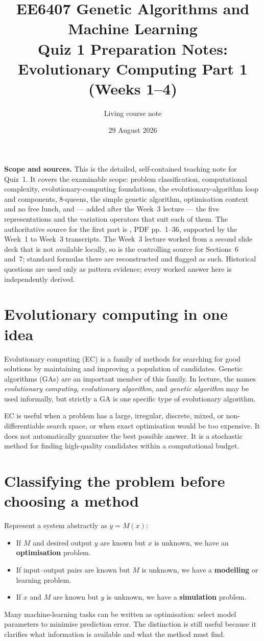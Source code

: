 \documentclass[11pt,a4paper]{article}
\title{EE6407 Genetic Algorithms and Machine Learning\\
\large Quiz 1 Preparation Notes: Evolutionary Computing Part 1 (Weeks 1--4)}
\author{Living course note}
\date{29 August 2026}
\begin{document}
\maketitle
\noindent\textbf{Scope and sources.} This is the detailed, self-contained
teaching note for Quiz~1. It covers the examinable scope: problem
classification, computational complexity, evolutionary-computing foundations,
the evolutionary-algorithm loop and components, 8-queens, the simple genetic
algorithm, optimisation context and no free lunch, and --- added after the
Week~3 lecture --- the five representations and the variation operators that
suit each of them. The authoritative source for the first part is
, PDF
pp.~1--36, supported by the Week~1 to Week~3 transcripts. The Week~3 lecture
worked from a second slide deck that is not available locally, so
 is the controlling source for
Sections~6 and~7; standard formulas there are reconstructed and flagged as
such. Historical questions are used only as pattern evidence; every worked
answer here is independently derived.
\tableofcontents

\section{\enspace Evolutionary computing in one idea}
Evolutionary computing (EC) is a family of methods for searching for good solutions by maintaining and improving a population of candidates. Genetic algorithms (GAs) are an important member of this family. In lecture, the names \emph{evolutionary computing}, \emph{evolutionary algorithm}, and \emph{genetic algorithm} may be used informally, but strictly a GA is one specific type of evolutionary algorithm.

EC is useful when a problem has a large, irregular, discrete, mixed, or non-differentiable search space, or when exact optimisation would be too expensive. It does not automatically guarantee the best possible answer. It is a stochastic method for finding high-quality candidates within a computational budget.

\section{\enspace Classifying the problem before choosing a method}
Represent a system abstractly as $y=M(x)$:
\begin{itemize}
\item If $M$ and desired output $y$ are known but $x$ is unknown, we have an \textbf{optimisation} problem.
\item If input--output pairs are known but $M$ is unknown, we have a \textbf{modelling} or learning problem.
\item If $x$ and $M$ are known but $y$ is unknown, we have a \textbf{simulation} problem.
\end{itemize}
Many machine-learning tasks can be written as optimisation: select model parameters to minimise prediction error. The distinction is still useful because it clarifies what information is available and what the method must find.
\end{document}
